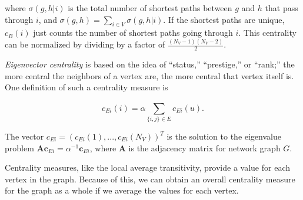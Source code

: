 \documentclass[12pt,twoside]{amherstthesis}
\begin{document}
  where \(\sigma(g,h|i)\) is the total number of shortest paths between
  \(g\) and \(h\) that pass through \(i\), and
  \(\sigma(g,h) = \sum_{i \in V}^{} \sigma(g,h|i)\). If the shortest paths
  are unique, \(c_{B}(i)\) just counts the number of shortest paths going
  through \(i\). This centrality can be normalized by dividing by a factor
  of \(\frac {(N_V - 1)(N_V - 2)} {2}\).
  
  \emph{Eigenvector centrality} is based on the idea of ``status,''
  ``prestige,'' or ``rank;'' the more central the neighbors of a vertex
  are, the more central that vertex itself is. One definition of such a
  centrality measure is
  
  \[c_{Ei}(i) = \alpha \sum_{\{i,j\} \in E}^{} c_{Ei} (u).\]
  
  The vector \(c_{Ei} = (c_{Ei}(1), ..., c_{Ei}(N_V))^T\) is the solution
  to the eigenvalue problem
  \(\textbf{A}\textbf{c}_{Ei} = \alpha^{-1}\textbf{c}_{Ei}\), where
  \(\textbf{A}\) is the adjacency matrix for network graph \(G\).
  
  Centrality measures, like the local average transitivity, provide a
  value for each vertex in the graph. Because of this, we can obtain an
  overall centrality measure for the graph as a whole if we average the
  values for each vertex.
  
\end{document}
